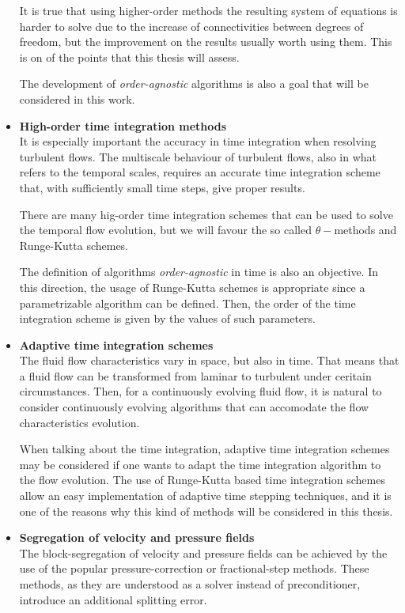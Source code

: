 \begin{itemize}
It is true that using higher-order methods the resulting system of equations is harder to solve due to the increase of connectivities between degrees of freedom, but the improvement on the results usually worth using them. This is on of the points that this thesis will assess.

The development of \textit{order-agnostic} algorithms is also a goal that will be considered in this work.

\item {\bf High-order time integration methods}\\
It is especially important the accuracy in time integration when resolving turbulent flows. The multiscale behaviour of turbulent flows, also in what refers to the temporal scales, requires an accurate time integration scheme that, with sufficiently small time steps, give proper results.

There are many hig-order time integration schemes that can be used to solve the temporal flow evolution, but we will favour the so called $ \theta- $methods and Runge-Kutta schemes.

The definition of algorithms \textit{order-agnostic} in time is also an objective. In this direction, the usage of Runge-Kutta schemes is appropriate since a parametrizable algorithm can be defined. Then, the order of the time integration scheme is given by the values of such parameters.

\item {\bf Adaptive time integration schemes}\\
The fluid flow characteristics vary in space, but also in time. That means that a fluid flow can be transformed from laminar to turbulent under ceritain circumstances. Then, for a continuously evolving fluid flow, it is natural to consider continuously evolving algorithms that can accomodate the flow characteristics evolution. 

When talking about the time integration, adaptive time integration schemes may be considered if one wants to adapt the time integration algorithm to the flow evolution. The use of Runge-Kutta based time integration schemes allow an easy implementation of adaptive time stepping techniques, and it is one of the reasons why this kind of methods will be considered in this thesis.

\item {\bf Segregation of velocity and pressure fields}\\
The block-segregation of velocity and pressure fields can be achieved by the use of the popular pressure-correction or fractional-step methods. These methods, as they are understood as a solver instead of preconditioner, introduce an additional splitting error.


\end{itemize}
